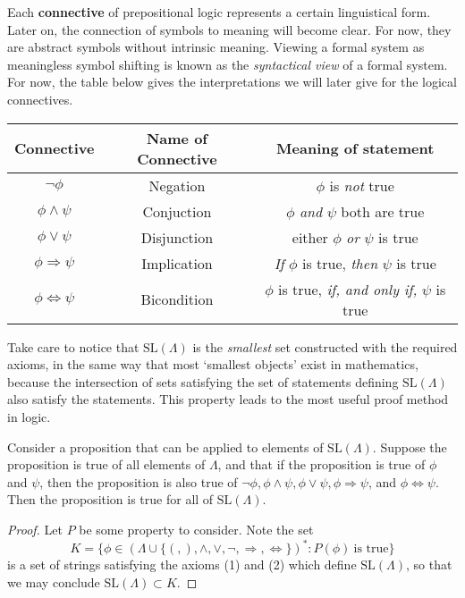 Each {\bf connective} of prepositional logic represents a certain linguistical form. Later on, the connection of symbols to meaning will become clear. For now, they are abstract symbols without intrinsic meaning. Viewing a formal system as meaningless symbol shifting is known as the {\it syntactical view} of a formal system. For now, the table below gives the interpretations we will later give for the logical connectives.
%
\begin{center}
\begin{tabular}{| c | c | c |}
    \hline Connective & Name of Connective & Meaning of statement \\
    \hline $\neg \phi$ & Negation & $\phi$ is {\it not} true\\
    $\phi \wedge \psi$ & Conjuction & $\phi$ {\it and} $\psi$ both are true\\
    $\phi \vee \psi$ & Disjunction & either $\phi$ {\it or} $\psi$ is true\\
    $\phi \Rightarrow \psi$ & Implication & {\it If} $\phi$ is true, {\it then} $\psi$ is true\\
    $\phi \Leftrightarrow \psi$ & Bicondition & $\phi$ is true, {\it if, and only if,} $\psi$ is true\\
    \hline
\end{tabular}
\end{center}

Take care to notice that $\text{SL}(\Lambda)$ is the {\it smallest} set constructed with the required axioms, in the same way that most `smallest objects' exist in mathematics, because the intersection of sets satisfying the set of statements defining $\text{SL}(\Lambda)$ also satisfy the statements. This property leads to the most useful proof method in logic.

\begin{theorem}
    Consider a proposition that can be applied to elements of $\text{SL}(\Lambda)$. Suppose the proposition is true of all elements of $\Lambda$, and that if the proposition is true of $\phi$ and $\psi$, then the proposition is also true of $\neg \phi, \phi \wedge \psi, \phi \vee \psi, \phi \Rightarrow \psi$, and $\phi \Leftrightarrow \psi$. Then the proposition is true for all of $\text{SL}(\Lambda)$.
\end{theorem}
\begin{proof}
    Let $P$ be some property to consider. Note the set
    \[ K = \{ \phi \in (\Lambda \cup \{ (, ), \wedge, \vee, \neg, \Rightarrow, \Leftrightarrow \})^* : P(\phi)\ \text{is true} \} \]
    is a set of strings satisfying the axioms (1) and (2) which define $\text{SL}(\Lambda)$, so that we may conclude $\text{SL}(\Lambda) \subset K$.
\end{proof}

